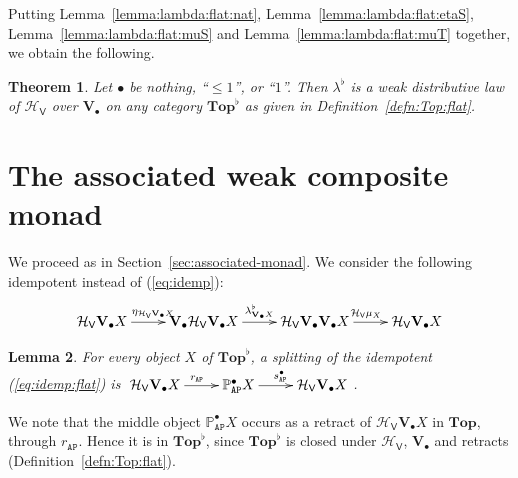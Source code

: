 \documentclass[preprint,12pt]{elsarticle}
\newcommand\Pred{\mathbb{P}}
\newcommand\Angel{{\mathtt{A}}}
\newcommand\Nature{{\mathtt{P}}}
\newcommand\AN{{\Angel\Nature}}
\newcommand\Hoare{{\mathcal H}}
\newcommand\Vt{\mathsf{V}}
\newcommand\HV{\Hoare_\Vt}
\newcommand\Val{{\mathbf V}}
\newcommand\Topcat{\mathbf{Top}}
\newtheorem{theorem}{Theorem}[section]
\newtheorem{lemma}[theorem]{Lemma}
\begin{document}
Putting Lemma~\ref{lemma:lambda:flat:nat}, Lemma~\ref{lemma:lambda:flat:etaS},
Lemma~\ref{lemma:lambda:flat:muS} and Lemma~\ref{lemma:lambda:flat:muT}
together, we obtain the following.
\begin{theorem}
  \label{thm:lambda:flat}
  Let $\bullet$ be nothing, ``$\leq 1$'', or ``$1$''.  Then
  $\lambda^\flat$ is a weak distributive law of $\HV$ over
  $\Val_\bullet$ on any category $\Topcat^\flat$ as given in
  Definition~\ref{defn:Top:flat}.
\end{theorem}

\section{The associated weak composite monad}
\label{sec:associated-monad:flat}

We proceed as in Section~\ref{sec:associated-monad}.
We consider the following idempotent instead of (\ref{eq:idemp}):
\begin{equation}
  \label{eq:idemp:flat}
  \xymatrix{
    \HV {\Val_\bullet X} \ar[r]^{\eta_{\HV {\Val_\bullet X}}}
    & \Val_\bullet {\HV {\Val_\bullet X}}
    \ar[r]^{\lambda^\flat_{\Val_\bullet X}}
    & \HV {\Val_\bullet {\Val_\bullet X}}
    \ar[r]^{\HV {\mu_X}}
    & \HV {\Val_\bullet X}
  }
\end{equation}

\begin{lemma}
  \label{lemma:idemp:split:flat}
  For every object $X$ of $\Topcat^\flat$, a splitting of the
  idempotent (\ref{eq:idemp:flat}) is
  $\xymatrix{\HV {\Val_\bullet X} \ar[r]^{r_\AN} & \Pred_\AN^\bullet X
    \ar[r]^{s_\AN^\bullet} & \HV {\Val_\bullet X}}$.
\end{lemma}
We note that the middle object $\Pred_\AN^\bullet X$ occurs as a
retract of $\HV {\Val_\bullet X}$ in $\Topcat$, through $r_\AN$.
Hence it is in $\Topcat^\flat$, since $\Topcat^\flat$ is closed under
$\HV$, $\Val_\bullet$ and retracts (Definition~\ref{defn:Top:flat}).
\end{document}
